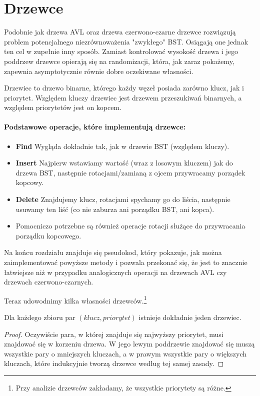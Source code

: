 \section{Drzewce}

\label{sec:drzewce}

Podobnie jak drzewa AVL oraz drzewa czerwono-czarne drzewce rozwiązują problem potencjalnego niezrównoważenia "zwykłego" BST.
Osiągają one jednak ten cel w zupełnie inny sposób.
Zamiast kontrolować wysokość drzewa i jego poddrzew drzewce opierają się na randomizacji, która, jak zaraz pokażemy, zapewnia asymptotycznie równie dobre oczekiwane własności. 

\begin{definition} 
Drzewiec to drzewo binarne, którego każdy węzeł posiada zarówno klucz, jak i priorytet.
Względem kluczy drzewiec jest drzewem przeszukiwań binarnych, a względem priorytetów jest on kopcem.
\end{definition}

\paragraph{Podstawowe operacje, które implementują drzewce:}
\begin{itemize}
    \item \textbf{Find} Wygląda dokładnie tak, jak w drzewie BST (względem kluczy).
    \item \textbf{Insert} Najpierw wstawiamy wartość (wraz z losowym kluczem) jak do drzewa BST, następnie rotacjami/zamianą z ojcem przywracamy porządek kopcowy.
    \item \textbf{Delete} Znajdujemy klucz, rotacjami spychamy go do liścia, następnie usuwamy ten liść (co nie zaburza ani porządku BST, ani kopca).
    \item Pomocniczo potrzebne są również operacje rotacji służące do przywracania porządku kopcowego.
\end{itemize}

Na końcu rozdziału znajduje się pseudokod, który pokazuje, jak można zaimplementować powyższe metody i pozwala przekonać się, że jest to znacznie łatwiejsze niż w przypadku analogicznych operacji na drzewach AVL czy drzewach czerwono-czarnych.

Teraz udowodnimy kilka własności drzewców.\footnote{Przy analizie drzewców zakładamy, że wszystkie priorytety są różne.}

\begin{theorem}
\label{unique treap}
 Dla każdego zbioru par $(klucz, priorytet)$ istnieje dokładnie jeden drzewiec.
\end{theorem}
\begin{proof}
Oczywiście para, w której znajduje się najwyższy priorytet, musi znajdować się w korzeniu drzewa.
W jego lewym poddrzewie znajdować się muszą wszystkie pary o mniejszych kluczach, a w prawym wszystkie pary o większych kluczach, które indukcyjnie tworzą drzewce według tej samej zasady.
\end{proof}

